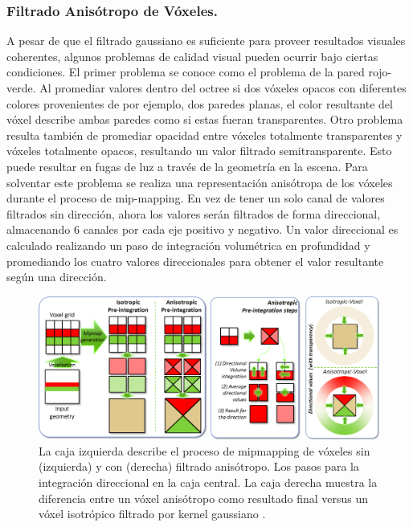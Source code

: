 \subsubsection{Filtrado Anisótropo de Vóxeles.}
\label{subsub:aniso_voxels_orig}
A pesar de que el filtrado gaussiano es suficiente para proveer resultados visuales coherentes, algunos problemas de calidad visual pueden ocurrir bajo ciertas condiciones. El primer problema se conoce como el problema de la pared rojo-verde. Al promediar valores dentro del octree si dos vóxeles opacos con diferentes colores provenientes de por ejemplo, dos paredes planas, el color resultante del vóxel describe ambas paredes como si estas fueran transparentes. Otro problema resulta también de promediar opacidad entre vóxeles totalmente transparentes y vóxeles totalmente opacos, resultando un valor filtrado semitransparente. Esto puede resultar en fugas de luz a través de la geometría en la escena.
Para solventar este problema se realiza una representación anisótropa de los vóxeles durante el proceso de mip-mapping. En vez de tener un solo canal de valores filtrados sin dirección, ahora los valores serán filtrados de forma direccional, almacenando 6 canales por cada eje positivo y negativo. Un valor direccional es calculado realizando un paso de integración volumétrica en profundidad y promediando los cuatro valores direccionales para obtener el valor resultante según una dirección.

\begin{figure}[H]
	\centering
	\includegraphics[width=0.95\linewidth]{media/image23177.png}
	\caption{La caja izquierda describe el proceso de mipmapping de vóxeles sin (izquierda) y con (derecha) filtrado anisótropo. Los pasos para la integración direccional en la caja central. La caja derecha muestra la diferencia entre un vóxel anisótropo como resultado final versus un vóxel isotrópico filtrado por kernel gaussiano \cite{CNSGE11b}.}
	\label{fig:vct_anisofiltering}
\end{figure}

